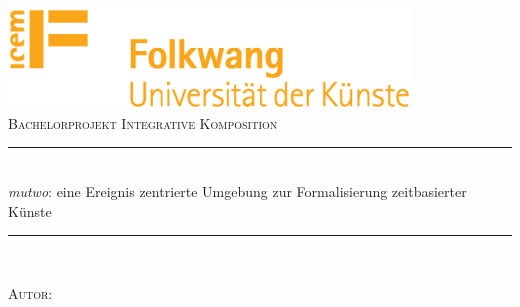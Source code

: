 \documentclass[12pt,a4paper,ngerman]{article}
\begin{document}

\begin{titlepage}

\newcommand{\HRule}{\rule{\linewidth}{0.5mm}} %

\center%
 

\includegraphics[width=0.8\textwidth]{pictures/folk_logoicemCMYKDT}\\[1cm] %
\textsc{\Large Bachelorprojekt Integrative Komposition}\\[0.5cm] %


\HRule\\[0.4cm]
{\huge \emph{mutwo}: eine Ereignis zentrierte Umgebung zur Formalisierung zeitbasierter Künste}\\[0.2cm]
\HRule\\[1.5cm]
 

\begin{minipage}[b]{.25\textwidth}
\end{minipage}%
\begin{minipage}[b]{.25\textwidth}
\begin{flushleft}
\textsc{Autor:}


\end{flushleft}
\end{minipage}
\end{titlepage}
\end{document}
